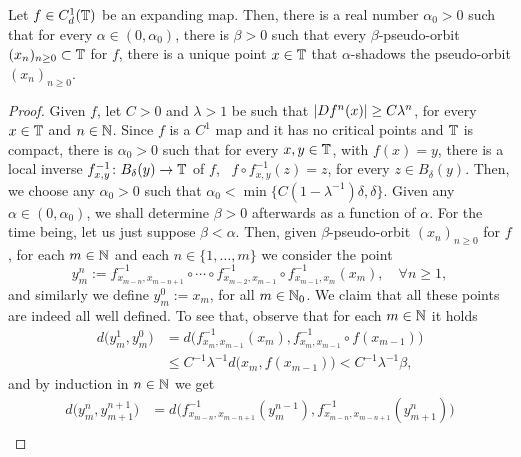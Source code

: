 \begin{theorem}
  \label{thm:shadowing-lemma-circ-expanding}
  Let $f\in C_d^1(\mathbb{T})$ be an expanding map. Then, there is a real number $\alpha_0>0$ such that for every $\alpha\in (0,\alpha_0)$, there is $\beta>0$ such that every $\beta$-pseudo-orbit $(x_n)_{n\geq 0}\subset\mathbb{T}$ for $f$, there is a unique point $x\in\mathbb{T}$ that $\alpha$-shadows the pseudo-orbit $(x_n)_{n\geq 0}$.
\end{theorem}

\begin{proof}
  Given $f$, let $C>0$ and $\lambda>1$ be such that $\left\lvert{Df^n(x)}\right\rvert\geq C\lambda^n$, for every $x\in\mathbb{T}$ and $n\in\mathbb{N}$. Since $f$ is a $C^1$ map and it has no critical points and $\mathbb{T}$ is compact, there is $\alpha_0>0$ such that for every $x,y\in\mathbb{T}$, with $f(x)=y$, there is a local inverse $f_{x,y}^{-1}\colon B_\delta(y)\to\mathbb{T}$ of $f$, \ie~$f\circ f_{x,y}^{-1}(z)=z$, for every $z\in B_\delta(y)$. Then, we choose any $\alpha_0>0$ such that $\alpha_0<\min\{C(1-\lambda^{-1})\delta,\delta\}$. Given any $\alpha\in (0,\alpha_0)$, we shall determine $\beta>0$ afterwards as a function of $\alpha$. For the time being, let us just suppose $\beta<\alpha$. Then, given $\beta$-pseudo-orbit $(x_n)_{n\geq 0}$ for $f$, for each $m\in\mathbb{N}$ and each $n\in\{1,\ldots,m\}$ we consider the point
  \begin{displaymath}
    y_m^n:= f_{x_{m-n},x_{m-n+1}}^{-1}\circ\cdots\circ f_{x_{m-2},x_{m-1}}^{-1} \circ f_{x_{m-1},x_m}^{-1}(x_m), \quad\forall n\geq 1,
  \end{displaymath}
  and similarly we define $y_m^0:=x_m$, for all $m\in\mathbb{N}_0$.
  We claim that all these points are indeed all well defined. To see that, observe that for each $m\in\mathbb{N}$ it holds
  \begin{displaymath}
    \begin{split}
      d\big(y_m^1,y_m^0\big)&=d\big(f_{x_m,x_{m-1}}^{-1}(x_m), f_{x_m,x_{m-1}}^{-1}\circ f(x_{m-1})\big)\\
                              &\leq C^{-1}\lambda^{-1}d\big(x_m,f(x_{m-1})\big)<C^{-1}\lambda^{-1}\beta,
    \end{split}
  \end{displaymath}
  and by induction in $n\in\mathbb{N}$ we get
  \begin{equation}
    \label{eq:y-m-n-y-m-1-n-1-estimate}
    \begin{split}
      d\big(y_m^n,y_{m+1}^{n+1}\big) &= d\big(f_{x_{m-n},x_{m-n+1}}^{-1}(y_m^{n-1}), f_{x_{m-n},x_{m-n+1}}^{-1}(y_{m+1}^{n})\big)\\

\end{split}
\end{equation}
\end{proof}
